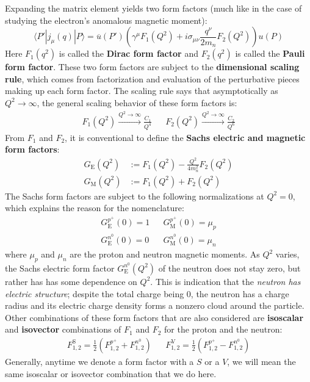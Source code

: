 \documentclass[11pt, oneside]{article}   	%
\theoremstyle{definition}
\begin{document}
Expanding the matrix element yields two form factors (much like in the case of studying the electron's anomalous magnetic moment):
\begin{equation}
	\langle P' | j_\mu(q) | P\rangle = \overline{u}(P')\left(\gamma^\mu F_1(Q^2) + i\sigma_{\mu\nu} \frac{q^\nu}{2m_n} F_2(Q^2)\right) u(P)
\end{equation}
Here $F_1(q^2)$ is called the \textbf{Dirac form factor} and $F_2(q^2)$ is called the \textbf{Pauli form factor}. These two form factors 
are subject to the \textbf{dimensional scaling rule}, which comes from factorization and evaluation of the perturbative pieces making up each 
form factor. The scaling rule says that asymptotically as $Q^2\rightarrow\infty$, the general scaling behavior of these form factors is:
\begin{align}
	F_1(Q^2)\xrightarrow{Q^2\rightarrow\infty} \frac{C_1}{Q^4} && F_2(Q^2)\xrightarrow{Q^2\rightarrow\infty} \frac{C_2}{Q^6}
\end{align}
From $F_1$ and $F_2$, it is conventional to define the \textbf{Sachs electric and magnetic form factors}:
\begin{align}
	G_\mathrm{E}(Q^2) &:= F_1(Q^2) - \frac{Q^2}{4 m_n^2} F_2(Q^2) \\
	G_\mathrm{M}(Q^2) &:= F_1(Q^2) + F_2(Q^2)
\end{align}
The Sachs form factors are subject to the following normalizations at $Q^2 = 0$, which explains the reason for the nomenclature:
\begin{align}
	G_\mathrm{E}^{p^+}(0) = 1 && G_{\mathrm M}^{p^+}(0) = \mu_p \\
	G_\mathrm{E}^{n^0}(0) = 0 && G_{\mathrm M}^{n^0}(0) = \mu_n
\end{align}
where $\mu_p$ and $\mu_n$ are the proton and neutron magnetic moments. As $Q^2$ varies, the Sachs electric form factor 
$G_\mathrm{E}^{n^0}(Q^2)$ of the neutron does not stay zero, but rather has has some dependence on $Q^2$. This is indication that the 
\textit{neutron has electric structure}; despite the total charge being 0, the neutron has a charge radius and its electric charge density forms 
a nonzero cloud around the particle. Other combinations of these form factors that are also 
considered are \textbf{isoscalar} and \textbf{isovector} combinations of $F_1$ and $F_2$ for the proton and the neutron:
\begin{align}
	F_{1, 2}^\mathrm{S} = \frac{1}{2}\left(F_{1, 2}^{p^+} + F_{1, 2}^{n^0}\right) && F_{1, 2}^\mathrm{V} = \frac{1}{2}\left(F_{1, 2}^{p^+} - 
	F_{1, 2}^{n^0}\right)
\end{align}
Generally, anytime we denote a form factor with a $S$ or a $V$, we will mean the same isoscalar or isovector combination that we do here. 
\end{document}
